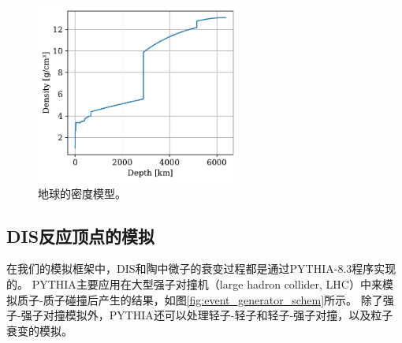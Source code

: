 \begin{figure}[htb]
\centering
    \includegraphics[width=0.60\textwidth]{img/prem.pdf}
    \caption{地球的密度模型。}
    \label{fig:prem}
\end{figure}

\subsection{DIS反应顶点的模拟}

在我们的模拟框架中，DIS和陶中微子的衰变过程都是通过\textsf{PYTHIA-8.3}程序\cite{Pythia8.2:2014, Pythia8.3:2022}实现的。
\textsf{PYTHIA}主要应用在大型强子对撞机（large hadron collider, LHC）中来模拟质子-质子碰撞后产生的结果，如图\ref{fig:event_generator_schem}所示。
除了强子-强子对撞模拟外，\textsf{PYTHIA}还可以处理轻子-轻子和轻子-强子对撞，以及粒子衰变的模拟。

